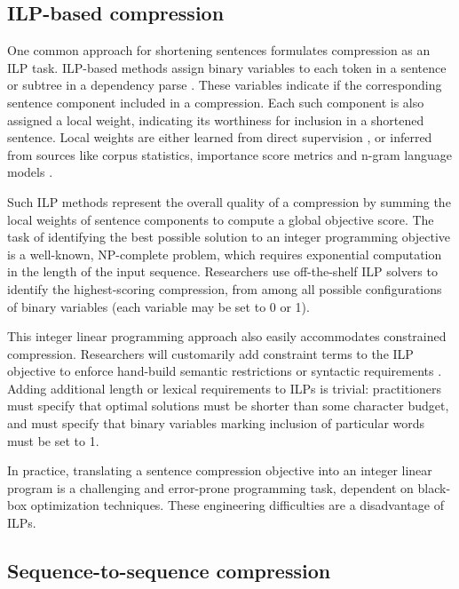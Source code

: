 \documentclass[11pt,a4paper]{article}
\begin{document}
\subsection{ILP-based compression}\label{s:ilps}

One common approach for shortening sentences formulates compression as an ILP task. ILP-based methods assign binary variables to each token in a sentence \cite{clarke2008global} or subtree in a dependency parse \cite{filippova2008dependency}. These variables indicate if the corresponding sentence component included in a compression. Each such component is also assigned a local weight, indicating its worthiness for inclusion in a shortened sentence. Local weights are either learned from direct supervision \cite{filippova2013overcoming,Wang2017CanSH}, or inferred from sources like corpus statistics, importance score metrics and n-gram language models \cite{clarke2008global,filippova2008dependency}.

Such ILP methods represent the overall quality of a compression by summing the local weights of sentence components to compute a global objective score.  The task of identifying the best possible solution to an integer programming objective is a well-known, NP-complete problem, which requires exponential computation in the length of the input sequence. Researchers use off-the-shelf ILP solvers to identify the highest-scoring compression, from among all possible configurations of binary variables (each variable may be set to 0 or 1).

This integer linear programming approach also easily accommodates constrained compression. Researchers will customarily add constraint terms to the ILP objective to enforce hand-build semantic restrictions \cite{clarke2008global} or syntactic requirements \cite{filippova2008dependency}. Adding additional length or lexical requirements to ILPs is trivial: practitioners must specify that optimal solutions must be shorter than some character budget, and must specify that binary variables marking inclusion of particular words must be set to 1. 

In practice, translating a sentence compression objective into an integer linear program is a challenging and error-prone programming task, dependent on black-box optimization techniques. These engineering difficulties are a disadvantage of ILPs.

\subsection{Sequence-to-sequence compression}
\end{document}
